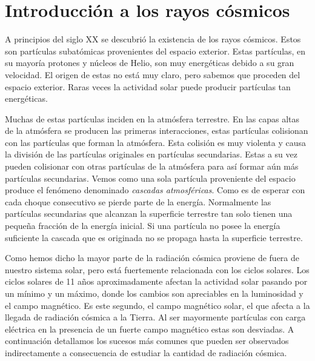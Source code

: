 \section{Introducción a los rayos cósmicos}
	A principios del siglo XX se descubrió la existencia de los rayos cósmicos. Estos son partículas subatómicas provenientes del espacio
	exterior. Estas partículas, en su mayoría protones y núcleos de Helio, son muy energéticas debido a su gran velocidad. El origen de estas no
	está muy claro, pero sabemos que proceden del espacio exterior. Raras veces la actividad solar puede producir partículas tan energéticas. 
	\par
	Muchas de estas partículas inciden en la atmósfera terrestre. En las capas altas de la atmósfera se producen las primeras interacciones, estas
	partículas colisionan con las partículas que forman la atmósfera. Esta colisión es muy violenta y causa la división de las partículas
	originales en partículas secundarias. Estas a su vez pueden colisionar con otras partículas de la atmósfera para así formar aún más partículas
	secundarias. Vemos como una sola partícula proveniente del espacio produce el fenómeno denominado \emph{cascadas atmosféricas}. Como es de
	esperar con cada choque consecutivo se pierde parte de la energía. Normalmente las partículas secundarias que alcanzan la superficie terrestre
	tan solo tienen una pequeña fracción de la energía inicial. Si una partícula no posee la energía suficiente la cascada que es originada no se
	propaga hasta la superficie terrestre.
	\par
	Como hemos dicho la mayor parte de la radiación cósmica proviene de fuera de nuestro sistema solar, pero está fuertemente relacionada con los
	ciclos solares. Los ciclos solares de 11 años aproximadamente afectan la actividad solar pasando por un mínimo y un máximo, donde los cambios
	son apreciables en la luminosidad y el campo magnético. Es este segundo, el campo magnético solar, el que afecta a la llegada de radiación
	cósmica a la Tierra. Al ser mayormente partículas con carga eléctrica en la presencia de un fuerte campo magnético estas son desviadas. A
	continuación detallamos los sucesos más comunes que pueden ser observados indirectamente a consecuencia de estudiar la cantidad de radiación
	cósmica.
